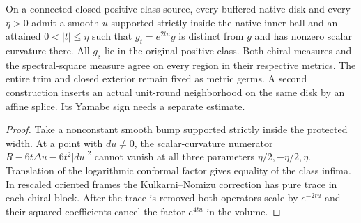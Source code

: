 \begin{theorem}
\label{thm:ed03-positive-conformal-core}
\leanok
On a connected closed positive-class source, every buffered native disk
and every $\eta>0$ admit a smooth $u$ supported strictly inside the native
inner ball and an attained $0<|t|\le\eta$ such that $g_t=e^{2tu}g$ is
distinct from $g$ and has nonzero scalar curvature there. All $g_s$ lie
in the original positive class. Both chiral measures and the spectral-square
measure agree on every region in their respective metrics. The entire
trim and closed exterior remain fixed as metric germs. A second construction
inserts an actual unit-round neighborhood on the same disk by an affine
splice. Its Yamabe sign needs a separate estimate.
\end{theorem}
\begin{proof}
\leanok
Take a nonconstant smooth bump supported strictly inside the protected
width. At a point with $du\ne0$, the scalar-curvature numerator
$R-6t\Delta u-6t^2|du|^2$ cannot vanish at all three parameters
$\eta/2,-\eta/2,\eta$. Translation of the logarithmic conformal factor
gives equality of the class infima. In rescaled oriented frames the
Kulkarni--Nomizu correction has pure trace in each chiral block. After
the trace is removed both operators scale by $e^{-2tu}$ and their
squared coefficients cancel the factor $e^{4tu}$ in the volume.
\end{proof}

